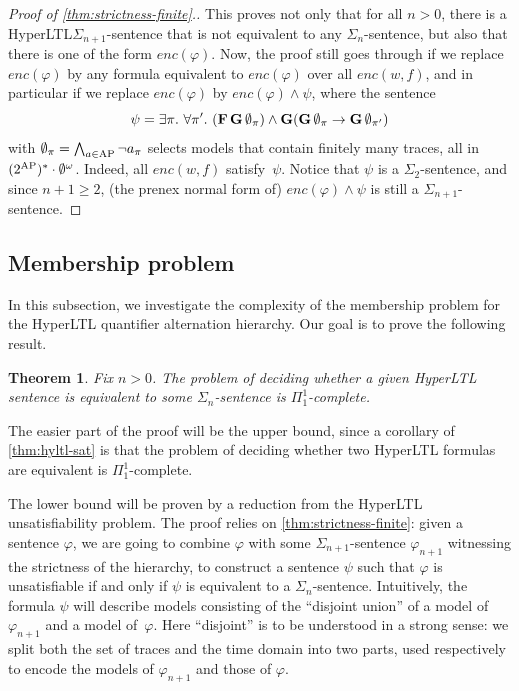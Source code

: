 \documentclass[dvipsnames,10pt,a4paper]{amsart}
\newtheorem{thm}{Theorem}[section]
\theoremstyle{definition}
\theoremstyle{remark}
\newcommand{\F}{\mathop{\mathbf{F}\vphantom{a}}\nolimits}
\newcommand{\G}{\mathop{\mathbf{G}\vphantom{a}}\nolimits}
\newcommand{\hyltl}{{HyperLTL}\xspace}
\newcommand\AP{\textup{AP}}
\newcommand\enc[2]{\mathit{enc}(#1,#2)}
\newcommand\encPhi[1]{\mathit{enc}(#1)}
\newcommand\Sign[1]{\Sigma_{#1}}
\begin{document}
\begin{proof}[Proof of \autoref{thm:strictness-finite}.]
  This proves not only that for all $n > 0$, there is a \hyltl $\Sigma_{n+1}$-sentence
  that is not equivalent to any $\Sigma_n$-sentence,
  but also that there is one of the form $\encPhi \varphi$.
  Now, the proof still goes through if we replace $\encPhi \varphi$ by
  any formula equivalent to $\encPhi \varphi$ over all $\enc{w}{f}$,
  and in particular if we replace $\encPhi \varphi$ by
  $\encPhi \varphi \land \psi$, where the sentence
  \[
    \psi = \exists \pi.\ \forall \pi'.\
    (\F \G \emptyset_\pi) \land
    \G( \G \emptyset_\pi \rightarrow  \G \emptyset_{\pi'})  \]
    with $
    \emptyset_\pi = \bigwedge_{a \in \AP} \lnot a_\pi$
  selects models that contain finitely many traces, all in
  $(2^\AP)^\ast \cdot \emptyset^\omega$.
  Indeed, all $\enc w f$ satisfy~$\psi$.
  Notice that $\psi$ is a $\Sigma_2$-sentence, and since $n+1 \ge 2$,
  (the prenex normal form of) $\encPhi \varphi \land \psi$ is still a $\Sign {n+1}$-sentence.
\end{proof}












\subsection{Membership problem}

In this subsection, we investigate the complexity of the membership problem for the \hyltl quantifier alternation hierarchy.
Our goal is to prove the following result.

\begin{thm}\label{thm:Pi11}
  Fix $n > 0$. The problem of deciding whether a given \hyltl sentence is equivalent
  to some $\Sigma_n$-sentence is $\Pi^1_1$-complete.
\end{thm}

The easier part of the proof will be the upper bound, since a corollary of
\autoref{thm:hyltl-sat} is that the problem of deciding whether two
\hyltl formulas are equivalent is $\Pi^1_1$-complete.

The lower bound will be proven by a reduction from the \hyltl unsatisfiability problem.
The proof relies on \autoref{thm:strictness-finite}: given a sentence
$\varphi$, we are going to combine $\varphi$ with some $\Sigma_{n+1}$-sentence
$\varphi_{n+1}$ witnessing the strictness of the hierarchy, to construct a sentence $\psi$
such that $\varphi$ is unsatisfiable if and only if $\psi$ is equivalent to
a $\Sigma_n$-sentence.
Intuitively, the formula $\psi$ will describe models consisting of the
``disjoint union'' of a model of $\varphi_{n+1}$ and a model of~$\varphi$.
Here ``disjoint'' is to be understood in a strong sense: we split both
the set of traces and the time domain into two parts, used respectively to
encode the models of $\varphi_{n+1}$ and those of $\varphi$.
\end{document}
